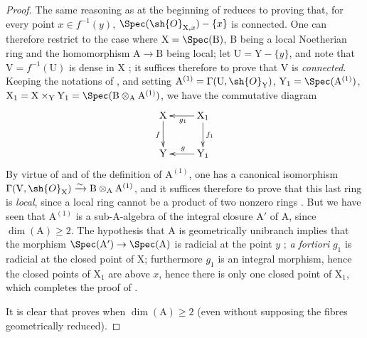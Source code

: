 \begin{proof}
The same reasoning as at the beginning of  reduces to proving that, for every point $x\in f^{-1}(y)$, $\Spec(\sh{O}_{\mathrm{X},x})-\{x\}$ is connected.
One can therefore restrict to the case where $\mathrm{X}=\Spec(\mathrm{B})$, B being a local Noetherian ring and the homomorphism $\mathrm{A}\to\mathrm{B}$ being local;
let $\mathrm{U}=\mathrm{Y}-\{y\}$, and note that $\mathrm{V}=f^{-1}(\mathrm{U})$ is dense in X ;
it suffices therefore to prove that V is \emph{connected}.
Keeping the notations of , and setting $\mathrm{A}^{(1)}=\Gamma(\mathrm{U},\sh{O}_{\mathrm{Y}})$, $\mathrm{Y}_1=\Spec(\mathrm{A}^{(1)})$, $\mathrm{X}_1=\mathrm{X}\times_{\mathrm{Y}}\mathrm{Y}_1=\Spec(\mathrm{B}\otimes_{\mathrm{A}}\mathrm{A}^{(1)})$, we have the commutative diagram
\[
  \xymatrix{
    \mathrm{X} \ar[d]_{f} & \mathrm{X}_1 \ar[l]^{g_1} \ar[d]^{f_1} \\
    \mathrm{Y} & \mathrm{Y}_1 \ar[l]_{g}
  }
\]
By virtue of  and of the definition of $\mathrm{A}^{(1)}$, one has a canonical isomorphism $\Gamma(\mathrm{V},\sh{O}_{\mathrm{X}})\xrightarrow{\sim}\mathrm{B}\otimes_{\mathrm{A}}\mathrm{A}^{(1)}$, and it suffices therefore to prove that this last ring is \emph{local}, since a local ring cannot be a product of two nonzero rings .
But we have seen  that $\mathrm{A}^{(1)}$ is a sub-A-algebra of the integral closure $\mathrm{A}'$ of A, since $\dim(\mathrm{A})\geq 2$.
The hypothesis that A is geometrically unibranch implies that the morphism $\Spec(\mathrm{A}')\to\Spec(\mathrm{A})$ is radicial at the point $y$ ;
\emph{a fortiori} $g_1$ is radicial at the closed point of X;
furthermore $g_1$ is an integral morphism, hence the closed points of $\mathrm{X}_1$ are above $x$, hence there is only one closed point of $\mathrm{X}_1$, which completes the proof of .

It is clear that  proves  when $\dim(\mathrm{A})\geq 2$ (even without supposing the fibres geometrically reduced).


\end{proof}
